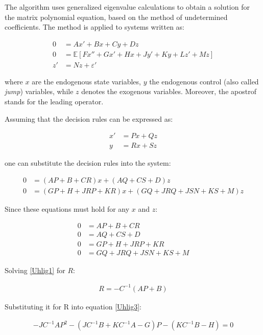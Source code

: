 \documentclass{pracamgr}
\numberwithin{equation}{section}
\begin{document}
The \citet{uhlig1998toolkit} algorithm uses generalized eigenvalue calculations to obtain a solution for the matrix polynomial equation, based on the method of undetermined coefficients. The method is applied to systems written as:

\begin{align}
0 &= Ax' + Bx + Cy + Dz \nonumber \\
0 &=\mathbb{E} \left[Fx'' + Gx' + Hx + Jy' + Ky + Lz' + Mz \right] \nonumber \\
z' &= Nz + \varepsilon'
\end{align}

where $x$ are the endogenous state variables, $y$ the endogenous control (also called \textit{jump}) variables, while $z$ denotes the exogenous variables. Moreover, the apostrof stands for the leading operator.

Assuming that the decision rules can be expressed as:

\begin{align}
x' &= Px + Qz \nonumber \\
y &= Rx + Sz
\end{align}

one can substitute the decision rules into the system:

\begin{align}
0 &= (AP+B+CR)x+(AQ+CS+D)z \nonumber \\
0 &= (GP+H+JRP+KR)x+(GQ+JRQ+JSN+KS+M)z
\end{align}

Since these equations must hold for any $x$ and $z$:

\begin{align}
0 &= AP+B+CR  \label{Uhlig1} \\
0 &= AQ+CS+D  \label{Uhlig2} \\
0 &= GP+H+JRP+KR  \label{Uhlig3} \\
0 &= GQ+JRQ+JSN+KS+M \label{Uhlig4}
\end{align}

Solving \ref{Uhlig1} for $R$:

\begin{align}
R = -C^{-1} \left(AP + B \right)
\end{align}

Substituting it for R into equation \ref{Uhlig3}:

\begin{align}
-JC^{-1}AP^{2} - \left(JC^{-1}B + KC^{-1}A - G \right)P - \left(KC^{-1}B - H \right) = 0
\end{align} 
\end{document}
